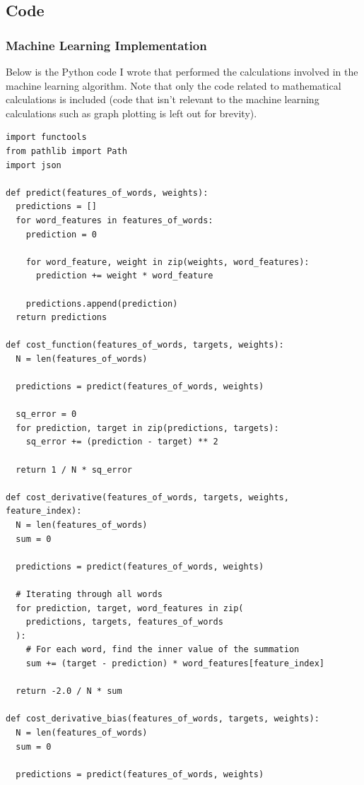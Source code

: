 \documentclass[12pt]{article}
\begin{document}
\subsection*{Code}

\subsubsection*{Machine Learning Implementation}

Below is the Python code I wrote that performed the calculations involved in the machine learning algorithm. Note that only the code related to mathematical calculations is included (code that isn't relevant to the machine learning calculations such as graph plotting is left out for brevity).
\begin{verbatim}
import functools
from pathlib import Path
import json

def predict(features_of_words, weights):
  predictions = []
  for word_features in features_of_words:
    prediction = 0

    for word_feature, weight in zip(weights, word_features):
      prediction += weight * word_feature

    predictions.append(prediction)
  return predictions

def cost_function(features_of_words, targets, weights):
  N = len(features_of_words)

  predictions = predict(features_of_words, weights)

  sq_error = 0
  for prediction, target in zip(predictions, targets):
    sq_error += (prediction - target) ** 2

  return 1 / N * sq_error

def cost_derivative(features_of_words, targets, weights, feature_index):
  N = len(features_of_words)
  sum = 0

  predictions = predict(features_of_words, weights)

  # Iterating through all words
  for prediction, target, word_features in zip(
    predictions, targets, features_of_words
  ):
    # For each word, find the inner value of the summation
    sum += (target - prediction) * word_features[feature_index]

  return -2.0 / N * sum

def cost_derivative_bias(features_of_words, targets, weights):
  N = len(features_of_words)
  sum = 0

  predictions = predict(features_of_words, weights)


\end{verbatim}
\end{document}
